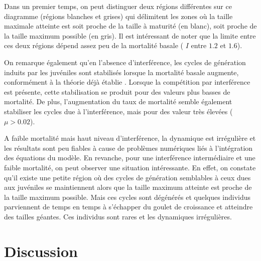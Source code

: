 Dans un premier temps, on peut distinguer deux régions différentes sur ce
diagramme (régions blanches et grises) qui délimitent les zones où
la taille maximale atteinte est soit proche de la taille à maturité (en blanc),
soit proche de la taille maximum possible (en gris). Il est intéressant de noter
que la limite entre ces deux régions dépend assez peu de la mortalité basale
( $I$ entre $1.2$ et $1.6$).

On remarque également qu'en l'absence d'interférence, les cycles de génération
induits par les juvéniles sont stabilisés lorsque la mortalité basale augmente,
conformément à la théorie déjà établie \autocites{de-roos1997a}. Lorsque la
compétition par interférence est présente, cette stabilisation se produit pour
des valeurs plus basses de mortalité. De plus, l'augmentation du taux de
mortalité semble également stabiliser les cycles due à l'interférence, mais pour
des valeur très élevées ($\mu > 0.02$). 

A faible mortalité mais haut niveau d'interférence, la dynamique est irrégulière
et les résultats sont peu fiables à cause de problèmes numériques liés à
l'intégration des équations du modèle. En revanche, pour une interférence
intermédiaire et une faible mortalité, on peut observer une situation
intéressante. En effet, on constate qu'il existe une petite région où des cycles
de génération semblables à ceux dues aux juvéniles se maintiennent alors que la
taille maximum atteinte est proche de la taille maximum possible. Mais ces
cycles sont dégénérés et quelques individus parviennent de temps en temps à
s'échapper du goulet de croissance et atteindre des tailles géantes. Ces
individus sont rares et les dynamiques irrégulières. 

\section{Discussion}

